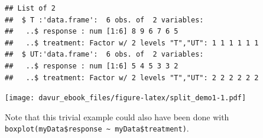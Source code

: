 \documentclass[]{book}
\newenvironment{Shaded}{\begin{snugshade}}{\end{snugshade}}
\newcommand{\DataTypeTok}[1]{\textcolor[rgb]{0.13,0.29,0.53}{#1}}
\newcommand{\DecValTok}[1]{\textcolor[rgb]{0.00,0.00,0.81}{#1}}
\newcommand{\KeywordTok}[1]{\textcolor[rgb]{0.13,0.29,0.53}{\textbf{#1}}}
\newcommand{\NormalTok}[1]{#1}
\newcommand{\OperatorTok}[1]{\textcolor[rgb]{0.81,0.36,0.00}{\textbf{#1}}}
\newcommand{\StringTok}[1]{\textcolor[rgb]{0.31,0.60,0.02}{#1}}
\begin{document}
\begin{Shaded}
\end{Shaded}

\begin{verbatim}
## List of 2
##  $ T :'data.frame':  6 obs. of  2 variables:
##   ..$ response : num [1:6] 8 9 6 7 6 5
##   ..$ treatment: Factor w/ 2 levels "T","UT": 1 1 1 1 1 1
##  $ UT:'data.frame':  6 obs. of  2 variables:
##   ..$ response : num [1:6] 5 4 5 3 3 2
##   ..$ treatment: Factor w/ 2 levels "T","UT": 2 2 2 2 2 2
\end{verbatim}

\begin{Shaded}
\end{Shaded}

\texttt{[image: davur\_ebook\_files/figure-latex/split\_demo1-1.pdf]}

Note that this trivial example could also have been done with \texttt{boxplot(myData\$response\ \textasciitilde{}\ myData\$treatment)}.
\end{document}
